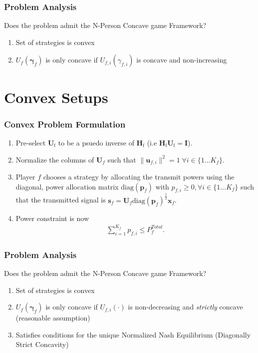 \documentclass[10pt,tgadventor, onlymath]{beamer}
\begin{document}
\begin{frame}
\frametitle{Problem Analysis}
Does the problem admit the N-Person Concave game Framework? 
\\
\begin{enumerate}
\item  Set of strategies is convex \faThumbsOUp
\item  $U_{f}(\boldsymbol{\gamma}_{f})$ is only concave if $U_{f,i}(\gamma_{f,i})$ is concave and non-increasing 
\faThumbsODown
\end{enumerate}

\end{frame}

\section{Convex Setups}

\begin{frame}
\frametitle{Convex Problem Formulation}
\begin{enumerate}
\item Pre-select $\mathbf{U}_\mathrm{f}$ to be a psuedo inverse of $\mathbf{H}_\mathrm{f}$  (i.e $\mathbf{H}_\mathrm{f}\mathbf{U}_\mathrm{f} = \mathbf{I}$).
\item 
	Normalize the columns of $\mathbf{U}_{f}$ such that 
	 $\|\mathbf{u}_{f,i}\|^2 =1 \;\forall i \in \{1 ... K_{f}\}$.
\item 
	Player $f$ chooses a strategy by allocating the transmit powers using the diagonal, power allocation  	
	matrix $\mathrm{diag}(\mathbf{p}_{f})$ with $p_{f,i} \geq 0, \forall i \in \{1 ... K_{f}\}$
such that the transmitted 		
	signal is 
	$\mathbf{s}_{f	}= \mathbf{U}_{f} 
	\mathrm{diag}(\mathbf{p}_{f})^{\frac{1}{2}}
	\mathbf{x}_{f}$.
\item 
	Power constraint is now 
	\begin{gather*}
	\sum_{i=1}^{K_{f}} p_{f,i}
	  \leq P^{Total}_{f}.
	  	\end{gather*}
\end{enumerate}
\end{frame}

\begin{frame}
\frametitle{Problem Analysis}
Does the problem admit the N-Person Concave game Framework? 
\\
\begin{enumerate}
\item  Set of strategies is convex \faThumbsOUp
\item  $U_{f}(\boldsymbol{\gamma}_{f})$ is only concave if 
	$U_{f,i}(\cdot)$ is non-decreasing and \emph{strictly} concave (reasonable assumption) \faThumbsOUp
\item 
	Satisfies conditions for the unique Normalized Nash Equilibrium (Diagonally Strict Concavity)  \faThumbsOUp
\end{enumerate}

\end{frame}
\end{document}
